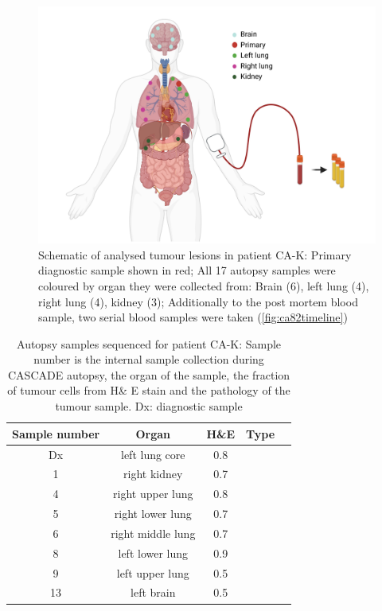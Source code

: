 \begin{figure}[ht]
\centering
\includegraphics[width=.99\linewidth]{Figures/CASCADE/CA82/CA-K_schematic_CA82_organColours}
\caption[Schematic of analysed tumour lesions in patient CA-K]{Schematic of analysed tumour lesions in patient CA-K: Primary diagnostic sample shown in red; All 17 autopsy samples were coloured by organ they were collected from: Brain (6), left lung (4), right lung (4), kidney (3); Additionally to the post mortem blood sample, two serial blood samples were taken (\protect\autoref{fig:ca82timeline})} \label{fig:ca82schematic}
\end{figure}

\begin{table}[ht]
\caption[Autopsy samples sequenced for patient CA-K]{Autopsy samples sequenced for patient CA-K: Sample number is the internal sample collection during CASCADE autopsy, the organ of the sample, the fraction of tumour cells from H\& E stain and the pathology of the tumour sample. Dx: diagnostic sample}\label{tab:ca82wgsSamples}
\centering
{}
\begin{tabular}{|c|c|c|c|c|}
\toprule
\hline
 \rowcolor{gray!50}
\textbf{Sample number} & \textbf{Organ} & \textbf{H\&E} & \textbf{Type}\\
\hline
 Dx & left lung core & 0.8 & \cellcolor{white} \\
 1 & right kidney & 0.7 & \cellcolor{white} \\
 4 & right upper lung & 0.8 & \cellcolor{white} \\
 5 & right lower lung & 0.7 & \cellcolor{white} \\
 6 & right middle lung & 0.7 & \cellcolor{white} \\
 8 & left lower lung & 0.9 & \cellcolor{white} \\
 9 & left upper lung & 0.5 & \cellcolor{white} \\
 13 & left brain & 0.5 & \cellcolor{white}\multirow{-8}{*}{adenocarcinoma} \\
 \hline
\bottomrule
\end{tabular}
\end{table} 


